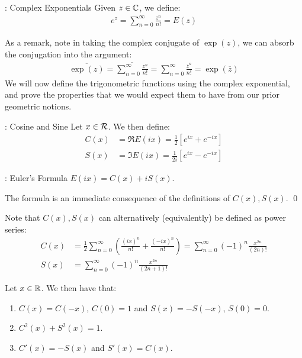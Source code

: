 \begin{ndef}{: Complex Exponentials}{}
    Given $z \in \mathbb{C}$, we define:
    \begin{align*}
        e^z = \sum_{n=0}^\infty \frac{z^n}{n!} = E(z)
    \end{align*}
\end{ndef}
\noindent As a remark, note in taking the complex conjugate of $\exp(z)$, we can absorb the conjugation into the argument:
\begin{align*}
    \overline{\exp(z)} = \overline{\sum_{n=0}^\infty \frac{z^n}{n!}} = \sum_{n=0}^\infty \frac{\overline{z}^n}{n!} = \exp(\overline{z})
\end{align*}
\noindent We will now define the trigonometric functions using the complex exponential, and prove the properties that we would expect them to have from our prior geometric notions.

\begin{ndef}{: Cosine and Sine}{}
    Let $x \in \mathcal{R}$. We then define:
    \begin{align*}
        C(x) &= \Re E(ix) = \frac{1}{2}\left[e^{ix} + e^{-ix}\right]
        \\ S(x) &= \Im E(ix) = \frac{1}{2i}\left[e^{ix} - e^{-ix}\right]
    \end{align*}
\end{ndef}

\begin{ntheorem}{: Euler's Formula}{}
    $E(ix) = C(x) + iS(x)$. 
\end{ntheorem}
\begin{nproof}
    The formula is an immediate consequence of the definitions of $C(x), S(x)$. \qed
\end{nproof}
\noindent Note that $C(x), S(x)$ can alternatively (equivalently) be defined as power series:
\begin{align*}
    C(x) &= \frac{1}{2}\sum_{n=0}^\infty \left(\frac{(ix)^n}{n!} + \frac{(-ix)^n}{n!}\right) = \sum_{n=0}^\infty (-1)^n \frac{x^{2n}}{(2n)!}
    \\ S(x) &= \sum_{n=0}^\infty (-1)^n \frac{x^{2n}}{(2n+1)!}
\end{align*}

\begin{ntheorem}{}{}
    Let $x \in \mathbb{R}$. We then have that:
    \begin{enumerate}
        \item $C(x) = C(-x)$, $C(0) = 1$ and $S(x) = -S(-x)$, $S(0) = 0$.
        \item $C^2(x) + S^2(x) = 1$.
        \item $C'(x) = -S(x)$ and $S'(x) = C(x)$.
    \end{enumerate}
\end{ntheorem}

